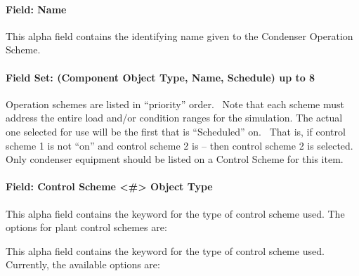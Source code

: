 \paragraph{Field: Name}\label{field-name-1-029}

This alpha field contains the identifying name given to the Condenser Operation Scheme.

\paragraph{Field Set: (Component Object Type, Name, Schedule) up to 8}\label{field-set-component-object-type-name-schedule-up-to-8-1}

Operation schemes are listed in ``priority'' order.~ Note that each scheme must address the entire load and/or condition ranges for the simulation. The actual one selected for use will be the first that is ``Scheduled'' on.~ That is, if control scheme 1 is not ``on'' and control scheme 2 is -- then control scheme 2 is selected. Only condenser equipment should be listed on a Control Scheme for this item.

\paragraph{Field: Control Scheme \textless{}\#\textgreater{} Object Type}\label{field-control-scheme-object-type-1}

This alpha field contains the keyword for the type of control scheme used. The options for plant control schemes are:

This alpha field contains the keyword for the type of control scheme used. Currently, the available options are:


